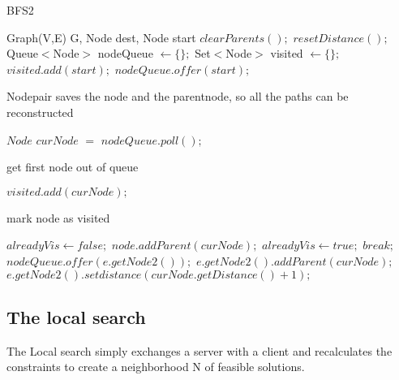 \documentclass [12pt]{article}
\begin{document}
    \begin{algorithm}[H]
        \caption{BFS2}
        \begin{algorithmic}[2]
            \Require Graph(V,E) G, Node dest, Node start
            \State $clearParents();$
            \State $resetDistance();$
            \State Queue$<$Node$>$ nodeQueue $\gets \{\};$
            \State Set$<$Node$>$ visited $\gets \{\};$
            \State $visited.add(start);$
            \State $nodeQueue.offer(start);$ \Comment \begin{itshape} Nodepair saves the node and the parentnode,
            so all the paths can be reconstructed\end{itshape}
            \State $Node$ $curNode$ $=$ $nodeQueue.poll();$ \Comment \begin{itshape} get first node out of queue\end{itshape}
            \State $visited.add(curNode);$ \Comment \begin{itshape} mark node as visited\end{itshape}            
                \EndIf
                        \State $alreadyVis \gets false;$
                            \State $node.addParent(curNode);$
                            \State $alreadyVis \gets true;$
                            \State $break;$
                        \EndFor
                        \State $nodeQueue.offer(e.getNode2());$
                        \State $e.getNode2().addParent(curNode);$
                        \State $e.getNode2().setdistance(curNode.getDistance()+1);$
                        \EndIf
                    \EndIf
                \EndIf
            \EndFor
            \EndWhile


            
        \end{algorithmic}
    \end{algorithm}
    \subsection{The local search}
    The Local search simply exchanges a server with a client and recalculates the constraints to create a neighborhood N of feasible solutions.
\end{document}
